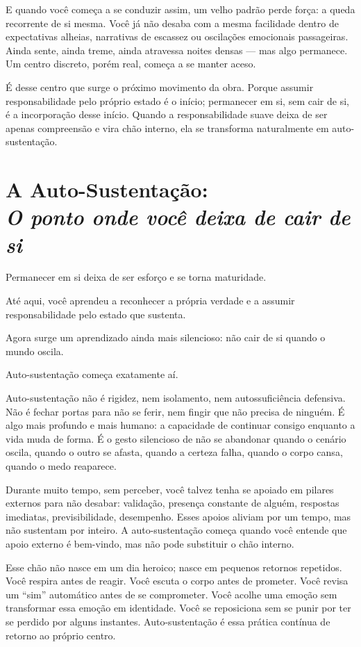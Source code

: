 \documentclass[12pt]{book}
\begin{document}
E quando você começa a se conduzir assim, um velho padrão perde força: a queda recorrente de si mesma. Você já não desaba com a mesma facilidade dentro de expectativas alheias, narrativas de escassez ou oscilações emocionais passageiras. Ainda sente, ainda treme, ainda atravessa noites densas --- mas algo permanece. Um centro discreto, porém real, começa a se manter aceso.

É desse centro que surge o próximo movimento da obra. Porque assumir responsabilidade pelo próprio estado é o início; permanecer em si, sem cair de si, é a incorporação desse início. Quando a responsabilidade suave deixa de ser apenas compreensão e vira chão interno, ela se transforma naturalmente em auto-sustentação.

\chapter[A Auto-Sustentação: O ponto onde você deixa de cair de si]{A Auto-Sustentação:\\[0.4ex]\large\itshape O ponto onde você deixa de cair de si}

Permanecer em si deixa de ser esforço e se torna maturidade.

Até aqui, você aprendeu a reconhecer a própria verdade e a assumir responsabilidade pelo estado que sustenta.

Agora surge um aprendizado ainda mais silencioso: não cair de si quando o mundo oscila.

Auto-sustentação começa exatamente aí.

Auto-sustentação não é rigidez, nem isolamento, nem autossuficiência defensiva. Não é fechar portas para não se ferir, nem fingir que não precisa de ninguém. É algo mais profundo e mais humano: a capacidade de continuar consigo enquanto a vida muda de forma. É o gesto silencioso de não se abandonar quando o cenário oscila, quando o outro se afasta, quando a certeza falha, quando o corpo cansa, quando o medo reaparece.

Durante muito tempo, sem perceber, você talvez tenha se apoiado em pilares externos para não desabar: validação, presença constante de alguém, respostas imediatas, previsibilidade, desempenho. Esses apoios aliviam por um tempo, mas não sustentam por inteiro. A auto-sustentação começa quando você entende que apoio externo é bem-vindo, mas não pode substituir o chão interno.

Esse chão não nasce em um dia heroico; nasce em pequenos retornos repetidos. Você respira antes de reagir. Você escuta o corpo antes de prometer. Você revisa um “sim” automático antes de se comprometer. Você acolhe uma emoção sem transformar essa emoção em identidade. Você se reposiciona sem se punir por ter se perdido por alguns instantes. Auto-sustentação é essa prática contínua de retorno ao próprio centro.
\end{document}
